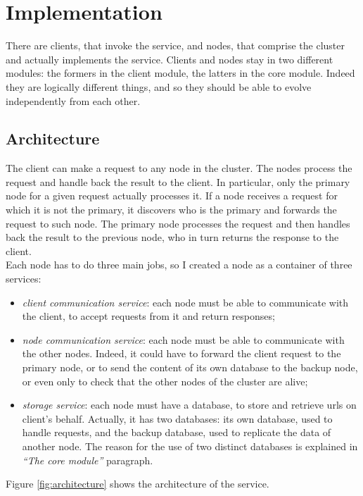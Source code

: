 \documentclass{article}
\begin{document}
\section{Implementation}  
There are clients, that invoke the service, and nodes, that comprise the cluster and actually implements the service. Clients and nodes stay in two different modules: the formers in the client module, the latters in the core module. Indeed they are logically different things, and so they should be able to evolve independently from each other. 

\subsection{Architecture} 

The client can make a request to any node in the cluster. The nodes process the request and handle back the result to the client.  In particular, only the primary node for a given request actually processes it. If a node receives a request for which it is not the primary, it discovers who is the primary and forwards the request to such node. The primary node processes the request and then handles back the result to the previous node, who in turn returns the response to the client. \\
Each node has to do three main jobs, so I created a node as a container of three services: 
\begin{itemize}
\item \textit{client communication service}: each node must be able to communicate with the client, to accept requests from it and return responses;
\item \textit{node communication service}: each node must be able to communicate with the other nodes. Indeed, it could have to forward the client request to the primary node, or to send the content of its own database to the backup node, or even only to check that the other nodes of the cluster are alive;
\item \textit{storage service}: each node must have a database, to store and retrieve urls on client's behalf. Actually, it has two databases: its own database, used to handle requests, and the backup database, used to replicate the data of another node. The reason for the use of two distinct databases is explained in \textit{``The core module''} paragraph. 
\end{itemize}
Figure \ref{fig:architecture} shows the architecture of the service.
\end{document}
